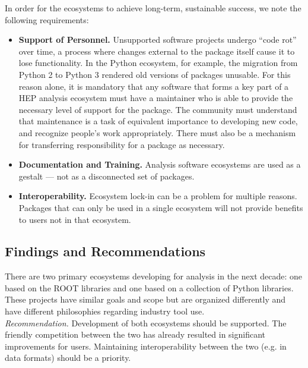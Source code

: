 In order for the ecosystems to achieve long-term, sustainable success, we note the following requirements:
\begin{itemize}
    \item \textbf{Support of Personnel.} Unsupported software projects undergo ``code rot'' over time, a process where changes external to the package itself cause it to lose functionality. In the Python ecosystem, for example, the migration from Python 2 to Python 3 rendered old versions of packages unusable. For this reason alone, it is mandatory that any software that forms a key part of a HEP analysis ecosystem must have a maintainer who is able to provide the necessary level of support for the package. The community must understand that maintenance is a task of equivalent importance to developing new code, and recognize people's work appropriately. There must also be a mechanism for transferring responsibility for a package as necessary.
    \item \textbf{Documentation and Training.} Analysis software ecosystems are used as a gestalt --- not as a disconnected set of packages. 
    \item \textbf{Interoperability.} Ecosystem lock-in can be a problem for multiple reasons. Packages that can only be used in a single ecosystem will not provide benefits to users not in that ecosystem. 
\end{itemize}

\subsection{Findings and Recommendations}
There are two primary ecosystems developing for analysis in the next decade: one based on the ROOT libraries and one based on a collection of Python libraries. These projects have similar goals and scope but are organized differently and have different philosophies regarding industry tool use.\\
\textit{Recommendation.} Development of both ecosystems should be supported. The friendly competition between the two has already resulted in significant improvements for users. Maintaining interoperability between the two (e.g. in data formats) should be a priority.

